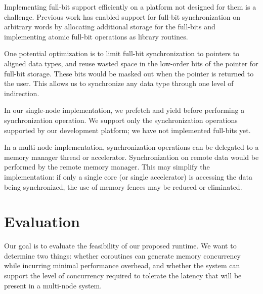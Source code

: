 \documentclass[10pt,nocopyrightspace,preprint]{sigplanconf}
\begin{document}
Implementing full-bit support efficiently on a platform not
designed for them is a challenge. Previous work \cite{qthreads} has
enabled support for full-bit synchronization on arbitrary words by
allocating additional storage for the full-bits and implementing
atomic full-bit operations as library routines.

One potential optimization is to limit full-bit synchronization to
pointers to aligned data types, and reuse wasted space in the
low-order bits of the pointer for full-bit storage. These bits
would be masked out when the pointer is returned to the user.  This
allows us to synchronize any data type through one level of
indirection.

In our single-node implementation, we prefetch and yield before performing
a synchronization operation. We support only the synchronization
operations supported by our development platform; we have not
implemented full-bits yet.

In a multi-node implementation, synchronization operations can be delegated to a memory manager
thread or accelerator. Synchronization on remote data would be
performed by the remote memory manager. This may simplify the
implementation: if only a single core (or single accelerator) is
accessing the data being synchronized, the use of memory fences may be
reduced or eliminated.


\section{Evaluation}
\label{sec:evaluation}

Our goal is to evaluate the feasibility of our proposed runtime. We
want to determine two things: whether coroutines can generate memory
concurrency while incurring minimal performance overhead, and whether the system can support the level of concurrency required to tolerate the latency that will be present in a multi-node system.
\end{document}
